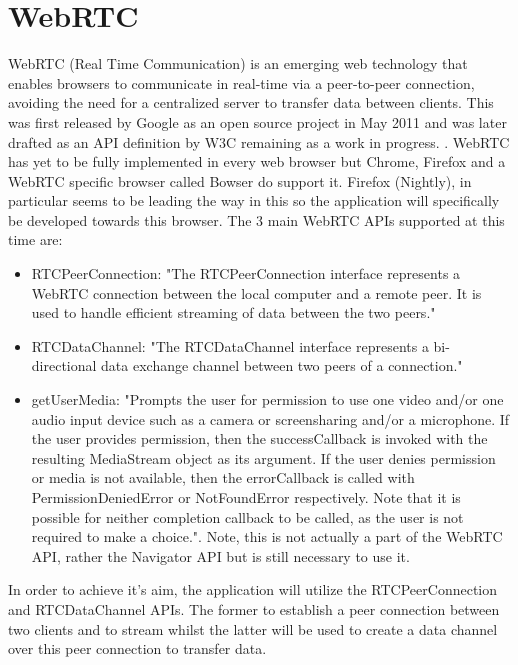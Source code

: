 \documentclass[]{report}
\begin{document}
\section{WebRTC}			
	WebRTC (Real Time Communication) is an emerging web technology that enables browsers to communicate in real-time via a peer-to-peer connection, avoiding the need for a centralized server to transfer data between clients. This was first released by Google as an open source project in May 2011 \cite{Google WebRTC Release} and was later drafted as an API definition by W3C remaining as a work in progress. \cite{W3C WebRTC Definition}. WebRTC has yet to be fully implemented in every web browser but Chrome, Firefox and a WebRTC specific browser called Bowser do support it. Firefox (Nightly), in particular seems to be leading the way in this so the application will specifically be developed towards this browser\cite{WebRTC browser support}.
	The 3 main WebRTC APIs supported at this time are:
		\begin{itemize}
			\item RTCPeerConnection:
			"The RTCPeerConnection interface represents a WebRTC connection between the local computer and a remote peer. It is used to handle efficient streaming of data between the two peers." 
			\cite{Mozilla Web API}
			\item RTCDataChannel:
			"The RTCDataChannel interface represents a bi-directional data exchange channel between two peers of a connection." \cite{Mozilla Web API}
			\item getUserMedia:
			"Prompts the user for permission to use one video and/or one audio input device such as a camera or screensharing and/or a microphone. If the user provides permission, then the successCallback is invoked with the resulting MediaStream object as its argument. If the user denies permission or media is not available, then the errorCallback is called with PermissionDeniedError or NotFoundError respectively. Note that it is possible for neither completion callback to be called, as the user is not required to make a choice."\cite{Mozilla Web API}. Note, this is not actually a part of the WebRTC API, rather the Navigator API but is still necessary to use it.
		\end{itemize}
		
	In order to achieve it's aim, the application will utilize the RTCPeerConnection and RTCDataChannel APIs. The former to establish a peer connection between two clients and to stream whilst the latter will be used to create a data channel over this peer connection to transfer data.
			
\end{document}
